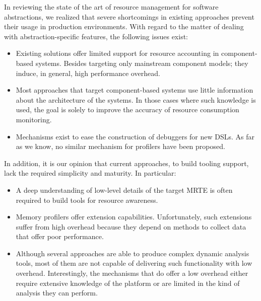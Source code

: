 In reviewing the state of the art of resource management for software abstractions, we realized that severe shortcomings in existing approaches prevent their usage in production environments.
With regard to the matter of dealing with abstraction-specific features, the following issues exist:

\begin{itemize}
\item Existing solutions offer limited support for resource accounting in component-based systems.
Besides targeting only mainstream component models; they induce, in general, high performance overhead. 

\item Most approaches that target component-based systems use little information about the architecture of the systems.
In those cases where such knowledge is used, the goal is solely to improve the accuracy of resource consumption monitoring.

\item Mechanisms exist to ease the construction of debuggers for new DSLs.
As far as we know, no similar mechanism for profilers have been proposed.

\end{itemize}

In addition, it is our opinion that current approaches, to build tooling support, lack the required simplicity and maturity. In particular:

\begin{itemize}
\item A deep understanding of low-level details of the target MRTE is often required to build tools for resource awareness.

\item Memory profilers offer extension capabilities.
Unfortunately, such extensions suffer from high overhead because they depend on methods to collect data that offer poor performance.

\item Although several approaches are able to produce complex dynamic analysis tools, most of them are not capable of delivering such functionality with low overhead.
Interestingly, the mechanisms that do offer a low overhead either require extensive knowledge of the platform or are limited in the kind of analysis they can perform.
\end{itemize} 


